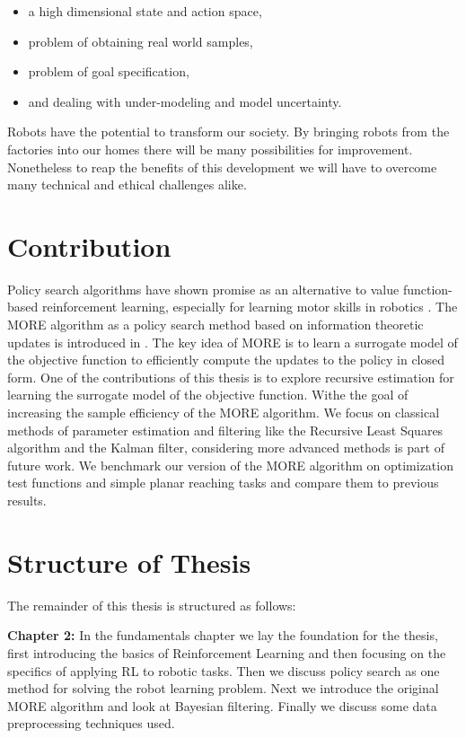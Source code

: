 \begin{itemize}
\item a high dimensional state and action space,
\item problem of obtaining real world samples,
\item problem of goal specification,
\item and dealing with under-modeling and model uncertainty.
\end{itemize}

Robots have the potential to transform our society. By
bringing robots from the factories into our homes there will be many
possibilities for improvement. Nonetheless to reap the benefits of this
development we will have to overcome many technical and
ethical challenges alike.



\section{Contribution}
Policy search algorithms have shown promise as an alternative
to value function-based reinforcement learning, especially for learning motor
skills in robotics \citep{deisenroth2013survey}.
The MORE algorithm as a policy search method based on
information theoretic updates is introduced in \citet{abdolmaleki2015model}.
The key idea of MORE is to learn a surrogate model of
the objective function to efficiently compute the updates to
the policy in closed form. One of
the contributions of this thesis is to explore recursive estimation 
for learning the surrogate model of the objective function.
Withe the goal of  increasing the sample efficiency of the MORE algorithm.
We focus on classical methods of parameter estimation and filtering
like the Recursive Least Squares algorithm and the Kalman filter,
considering more advanced methods is part of future work.
We benchmark our version of the MORE algorithm on optimization test functions
and simple planar reaching tasks and compare them to previous results.

\section{Structure of Thesis}
The remainder of this thesis is structured as follows:

\textbf{Chapter 2:} In the fundamentals chapter we lay the foundation for
the thesis, first introducing the basics of Reinforcement Learning and
then focusing on the specifics of applying RL to robotic tasks.
Then we discuss policy search as one method for
solving the robot learning problem.
Next we introduce the original MORE algorithm and
look at Bayesian filtering. Finally we discuss some data preprocessing
techniques used.

